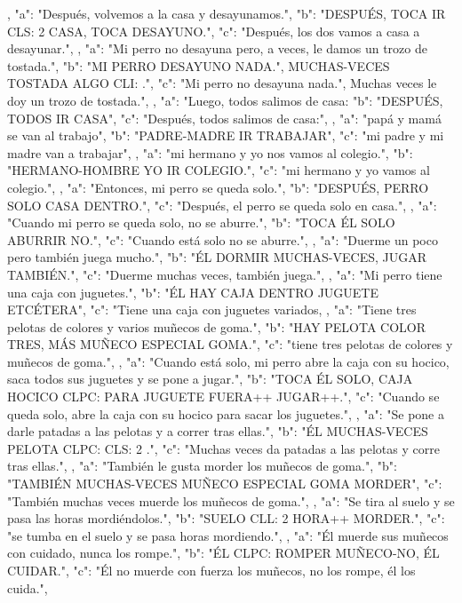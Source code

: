 ,
{
"a": "Después, volvemos a la casa y desayunamos.",
"b": "DESPUÉS, TOCA IR CLS: 2  CASA, TOCA DESAYUNO.",
"c": "Después, los dos vamos a casa a desayunar.",
}
,
{
"a": "Mi perro no desayuna pero, a veces, le damos un trozo de tostada.",
"b": "MI PERRO DESAYUNO NADA.", MUCHAS-VECES TOSTADA ALGO CLI: .",
"c": "Mi perro no desayuna nada.", Muchas veces le doy un trozo de tostada.",
}
,
{
"a": "Luego, todos salimos de casa:
"b": "DESPUÉS, TODOS IR CASA",
"c": "Después, todos salimos de casa:",
}
,
{
"a": "papá y mamá se van al trabajo",
"b": "PADRE-MADRE IR TRABAJAR",
"c": "mi padre y mi madre van a trabajar", 
}
,
{
"a": "mi hermano y yo nos vamos al colegio.",
"b": "HERMANO-HOMBRE YO IR COLEGIO.",
"c": "mi hermano y yo vamos al colegio.",
}
,
{
"a": "Entonces, mi perro se queda solo.",
"b": "DESPUÉS, PERRO SOLO CASA DENTRO.",
"c": "Después, el perro se queda solo en casa.",
}
,
{
"a": "Cuando mi perro se queda solo, no se aburre.",
"b": "TOCA ÉL SOLO ABURRIR NO.",
"c": "Cuando está solo no se aburre.",
}
,
{
"a": "Duerme un poco pero también juega mucho.",
"b": "ÉL DORMIR MUCHAS-VECES, JUGAR TAMBIÉN.",
"c": "Duerme muchas veces, también juega.",
}
,
{
"a": "Mi perro tiene una caja con juguetes.",
"b": "ÉL HAY CAJA DENTRO JUGUETE ETCÉTERA",
"c": "Tiene una caja con juguetes variados,
}
,
{
"a": "Tiene tres pelotas de colores y varios muñecos de goma.",
"b": "HAY PELOTA COLOR TRES, MÁS MUÑECO ESPECIAL GOMA.",
"c": "tiene tres pelotas de colores y muñecos de goma.",
}
,
{
"a": "Cuando está solo, mi perro abre la caja con su hocico, saca todos sus juguetes y se pone a jugar.",
"b": "TOCA ÉL SOLO, CAJA HOCICO CLPC:  PARA JUGUETE FUERA++ JUGAR++.",
"c": "Cuando se queda solo, abre la caja con su hocico para sacar los juguetes.",
}
,
{
"a": "Se pone a darle patadas a las pelotas y a correr tras ellas.",
"b": "ÉL MUCHAS-VECES PELOTA CLPC:  CLS: 2 .",
"c": "Muchas veces da patadas a las pelotas y corre tras ellas.",
}
,
{
"a": "También le gusta morder los muñecos de goma.",
"b": "TAMBIÉN MUCHAS-VECES MUÑECO ESPECIAL GOMA MORDER",
"c": "También muchas veces muerde los muñecos de goma.",
}
,
{
"a": "Se tira al suelo y se pasa las horas mordiéndolos.",
"b": "SUELO CLL: 2  HORA++ MORDER.",
"c": "se tumba en el suelo y se pasa horas mordiendo.",
}
,
{
"a": "Él muerde sus muñecos con cuidado, nunca los rompe.",
"b": "ÉL CLPC:  ROMPER MUÑECO-NO, ÉL CUIDAR.",
"c": "Él no muerde con fuerza los muñecos, no los rompe, él los cuida.",
}
